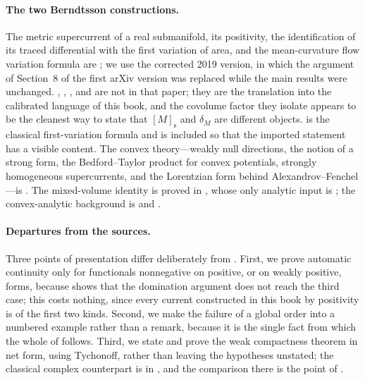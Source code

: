 \paragraph{The two Berndtsson constructions.}
The metric supercurrent of a real submanifold, its positivity, the
identification of its traced differential with the first variation of area,
and the mean-curvature flow variation formula are \cite[\S\S4--5]{Ber19Super};
we use the corrected 2019 version, in which the argument of Section~8 of the
first arXiv version was replaced while the main results were unchanged.
,
,
, and
 are not in that paper; they are the
translation into the calibrated language of this book, and the covolume
factor they isolate appears to be the cleanest way to state that
$[M]_{\mathrm s}$ and $\delta_M$ are different objects.
 is the classical first-variation formula and
is included so that the imported statement has a visible content.  The
convex theory---weakly null directions, the notion of a strong form, the
Bedford--Taylor product for convex potentials, strongly homogeneous
supercurrents, and the Lorentzian form behind Alexandrov--Fenchel---is
\cite[\S\S3--6 and 10]{Ber26Convex}.  The mixed-volume identity is proved in
, whose only analytic input is
; the convex-analytic background is
\cite{Roc70} and \cite{Sch14}.

\paragraph{Departures from the sources.}
Three points of presentation differ deliberately from
\cite{CLD25}.  First, we prove automatic continuity only for functionals
nonnegative on positive, or on weakly positive, forms, because
 shows that the domination argument does not
reach the third case; this costs nothing, since every current constructed in
this book by positivity is of the first two kinds.  Second, we make the
failure of a global order into a numbered example rather than a remark,
because it is the single fact from which the whole of
 follows.  Third, we state and prove the weak
compactness theorem  in net form, using
Tychonoff, rather than leaving the hypotheses unstated; the classical
complex counterpart is in \cite[Chapter~III]{Dem12}, and the comparison
there is the point of .
